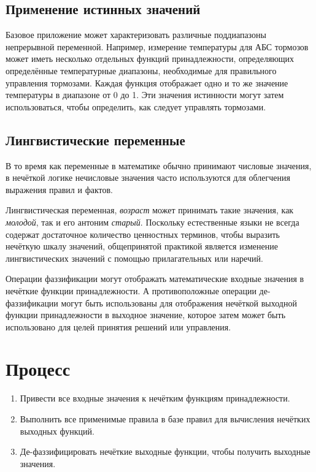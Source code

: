 \documentclass[a4paper,12pt]{report}
\begin{document}
\subsection{Применение истинных значений}
Базовое приложение может характеризовать различные поддиапазоны непрерывной переменной. Например, измерение температуры для АБС тормозов может иметь несколько отдельных функций принадлежности, определяющих определённые температурные диапазоны, необходимые для правильного управления тормозами. Каждая функция отображает одно и то же значение температуры в диапазоне от 0 до 1. Эти значения истинности могут затем использоваться, чтобы определить, как следует управлять тормозами.

\subsection{Лингвистические переменные}
В то время как переменные в математике обычно принимают числовые значения, в нечёткой логике нечисловые значения часто используются для облегчения выражения правил и фактов.

Лингвистическая переменная, \textit{возраст} может принимать такие значения, как \textit{молодой}, так и его антоним \textit{старый}. Поскольку естественные языки не всегда содержат достаточное количество ценностных терминов, чтобы выразить нечёткую шкалу значений, общепринятой практикой является изменение лингвистических значений с помощью прилагательных или наречий.

Операции фаззификации могут отображать математические входные значения в нечёткие функции принадлежности. А противоположные операции де-фаззификации могут быть использованы для отображения нечёткой выходной функции принадлежности в  выходное значение, которое затем может быть использовано для целей принятия решений или управления.

\section{Процесс}
\begin{enumerate}
	\item Привести все входные значения к нечётким функциям принадлежности.
	\item Выполнить все применимые правила в базе правил для вычисления нечётких выходных функций. 
	\item Де-фаззифицировать нечёткие выходные функции, чтобы получить  выходные значения.
\end{enumerate}
\end{document}
